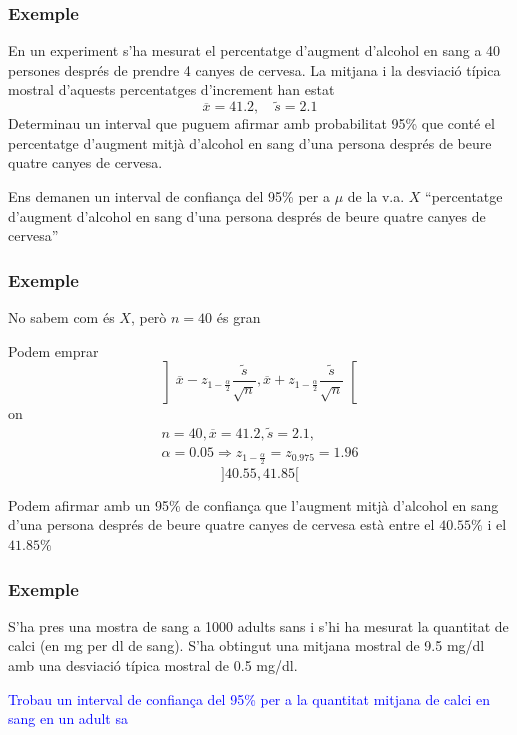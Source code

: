\documentclass[12pt,t]{beamer}
\newcommand{\blue}[1]{\textcolor{blue}{#1}}
\renewcommand{\emph}[1]{{\color{red}#1}}
\theoremstyle{plain}
\theoremstyle{definition}
\begin{document}
\begin{frame}
\frametitle{Exemple}
\vspace*{-2ex}

En un experiment s'ha mesurat el percentatge d'augment d'alcohol en sang a 40 persones després de prendre 4 canyes de cervesa. La mitjana i la desviació típica mostral d'aquests percentatges d'increment han estat
$$
\overline{x}=41.2,\quad \widetilde{s}=2.1
$$
Determinau un interval que puguem afirmar amb probabilitat 95\% que conté el  percentatge d'augment mitjà d'alcohol en sang d'una persona després de beure quatre canyes de cervesa.
\medskip
\pause

Ens demanen un \emph{interval de confiança del 95\%} per a $\mu$ de la v.a. $X$ ``percentatge d'augment d'alcohol en sang d'una persona després de beure quatre canyes de cervesa''


\end{frame}


\begin{frame}
\frametitle{Exemple}

No sabem com és $X$, però $n=40$ és gran
\medskip

Podem emprar
$$
\left]\overline{x}-z_{1-\frac{\alpha}{2}}\frac{\widetilde{s}}{\sqrt{n}},
    \overline{x}+z_{1-\frac{\alpha}{2}}\frac{\widetilde{s}}{\sqrt{n}}\right[
$$
on
$$
\begin{array}{c}
n=40,\overline{x}=41.2,\widetilde{s}=2.1,\\[1ex]
\alpha=0.05\Rightarrow z_{1-\frac{\alpha}{2}}=z_{0.975}=1.96
\end{array}
$$
\pause
$$
]40.55, 41.85[
$$

Podem afirmar amb un 95\% de confiança que l'augment mitjà d'alcohol en sang d'una persona després de beure quatre canyes de cervesa està entre el $40.55\%$ i el $41.85\%$


\end{frame}



\begin{frame}
\frametitle{Exemple}
\vspace*{-2ex}

S'ha pres una mostra de sang a 1000 adults sans i s'hi ha mesurat la quantitat  de calci (en mg per dl de sang). S'ha obtingut una mitjana mostral de 9.5 mg/dl amb una desviació típica mostral de 0.5 mg/dl. 
\medskip

\blue{Trobau un interval de confiança del 95\% per a la quantitat mitjana de calci en sang en un adult sa}

\end{frame}
\end{document}

